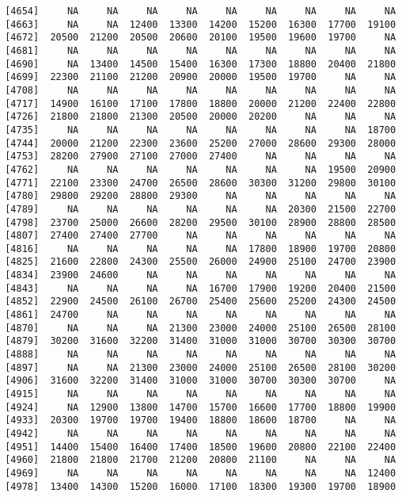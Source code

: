 \documentclass[]{article}
\begin{document}
\begin{verbatim}
 [4654]     NA     NA     NA     NA     NA     NA     NA     NA     NA
 [4663]     NA     NA  12400  13300  14200  15200  16300  17700  19100
 [4672]  20500  21200  20500  20600  20100  19500  19600  19700     NA
 [4681]     NA     NA     NA     NA     NA     NA     NA     NA     NA
 [4690]     NA  13400  14500  15400  16300  17300  18800  20400  21800
 [4699]  22300  21100  21200  20900  20000  19500  19700     NA     NA
 [4708]     NA     NA     NA     NA     NA     NA     NA     NA     NA
 [4717]  14900  16100  17100  17800  18800  20000  21200  22400  22800
 [4726]  21800  21800  21300  20500  20000  20200     NA     NA     NA
 [4735]     NA     NA     NA     NA     NA     NA     NA     NA  18700
 [4744]  20000  21200  22300  23600  25200  27000  28600  29300  28000
 [4753]  28200  27900  27100  27000  27400     NA     NA     NA     NA
 [4762]     NA     NA     NA     NA     NA     NA     NA  19500  20900
 [4771]  22100  23300  24700  26500  28600  30300  31200  29800  30100
 [4780]  29800  29200  28800  29300     NA     NA     NA     NA     NA
 [4789]     NA     NA     NA     NA     NA     NA  20300  21500  22700
 [4798]  23700  25000  26600  28200  29500  30100  28900  28800  28500
 [4807]  27400  27400  27700     NA     NA     NA     NA     NA     NA
 [4816]     NA     NA     NA     NA     NA  17800  18900  19700  20800
 [4825]  21600  22800  24300  25500  26000  24900  25100  24700  23900
 [4834]  23900  24600     NA     NA     NA     NA     NA     NA     NA
 [4843]     NA     NA     NA     NA  16700  17900  19200  20400  21500
 [4852]  22900  24500  26100  26700  25400  25600  25200  24300  24500
 [4861]  24700     NA     NA     NA     NA     NA     NA     NA     NA
 [4870]     NA     NA     NA  21300  23000  24000  25100  26500  28100
 [4879]  30200  31600  32200  31400  31000  31000  30700  30300  30700
 [4888]     NA     NA     NA     NA     NA     NA     NA     NA     NA
 [4897]     NA     NA  21300  23000  24000  25100  26500  28100  30200
 [4906]  31600  32200  31400  31000  31000  30700  30300  30700     NA
 [4915]     NA     NA     NA     NA     NA     NA     NA     NA     NA
 [4924]     NA  12900  13800  14700  15700  16600  17700  18800  19900
 [4933]  20300  19700  19700  19400  18800  18600  18700     NA     NA
 [4942]     NA     NA     NA     NA     NA     NA     NA     NA     NA
 [4951]  14400  15400  16400  17400  18500  19600  20800  22100  22400
 [4960]  21800  21800  21700  21200  20800  21100     NA     NA     NA
 [4969]     NA     NA     NA     NA     NA     NA     NA     NA  12400
 [4978]  13400  14300  15200  16000  17100  18300  19300  19700  18900

\end{verbatim}
\end{document}
